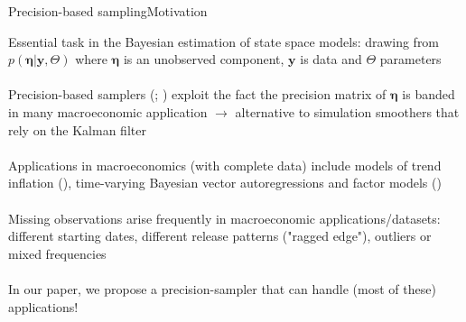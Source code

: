 \documentclass[xcolor=svgnames, 10pt, aspectratio=169]{beamer}
\begin{document}
\begin{frame}{Precision-based sampling}{Motivation}

Essential task in the Bayesian estimation of state space models: drawing from $p(\boldsymbol{\eta} | \mathbf{y}, \Theta)$ where $\boldsymbol{\eta}$ is an unobserved component, $\mathbf{y}$ is data and $\Theta$ parameters \\~\\

Precision-based samplers (\citealp[][\scriptsize \textbf{IJMMNO}\normalsize]{chanjelizakov_2009}; \citealp[][\scriptsize \textbf{JEcmtrics}\normalsize]{mccausland_2012}) exploit the fact the precision matrix of $\boldsymbol{\eta}$ is banded in many macroeconomic application $\rightarrow$ alternative to simulation smoothers that rely on the Kalman filter \\~\\

Applications in macroeconomics (with complete data) include models of trend inflation (\citealp[][\scriptsize \textbf{JBES}\normalsize]{chankooppotter_jae2013}), time-varying Bayesian vector autoregressions \citep[][\scriptsize \textbf{JBES}\normalsize]{chan_2020jbes} and factor models (\citealp[][\scriptsize \textbf{JAE}\normalsize]{kaufmannschumacher_jae2017})\\~\\

Missing observations arise frequently in macroeconomic applications/datasets: different starting dates, different release patterns ("ragged edge"), outliers or mixed frequencies\\~\\

In our paper, we propose a precision-sampler that can handle (most of these) applications! 

\end{frame}
\end{document}
